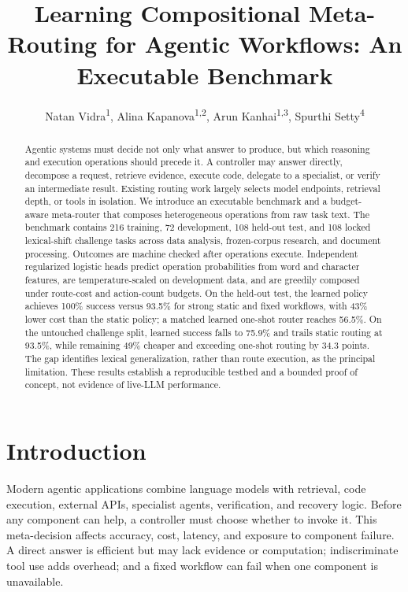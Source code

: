 \documentclass[letterpaper]{article} %
\title{Learning Compositional Meta-Routing for Agentic Workflows: An Executable Benchmark}
\author{
Natan Vidra\textsuperscript{\rm 1},
Alina Kapanova\textsuperscript{\rm 1,\rm 2},
Arun Kanhai\textsuperscript{\rm 1,\rm 3},
Spurthi Setty\textsuperscript{\rm 4}
}
\begin{document}
\maketitle

\begin{abstract}
Agentic systems must decide not only what answer to produce, but which reasoning and execution operations should precede it. A controller may answer directly, decompose a request, retrieve evidence, execute code, delegate to a specialist, or verify an intermediate result. Existing routing work largely selects model endpoints, retrieval depth, or tools in isolation. We introduce an executable benchmark and a budget-aware meta-router that composes heterogeneous operations from raw task text. The benchmark contains 216 training, 72 development, 108 held-out test, and 108 locked lexical-shift challenge tasks across data analysis, frozen-corpus research, and document processing. Outcomes are machine checked after operations execute. Independent regularized logistic heads predict operation probabilities from word and character features, are temperature-scaled on development data, and are greedily composed under route-cost and action-count budgets. On the held-out test, the learned policy achieves 100\% success versus 93.5\% for strong static and fixed workflows, with 43\% lower cost than the static policy; a matched learned one-shot router reaches 56.5\%. On the untouched challenge split, learned success falls to 75.9\% and trails static routing at 93.5\%, while remaining 49\% cheaper and exceeding one-shot routing by 34.3 points. The gap identifies lexical generalization, rather than route execution, as the principal limitation. These results establish a reproducible testbed and a bounded proof of concept, not evidence of live-LLM performance.
\end{abstract}


\section{Introduction}

Modern agentic applications combine language models with retrieval, code execution, external APIs, specialist agents, verification, and recovery logic. Before any component can help, a controller must choose whether to invoke it. This meta-decision affects accuracy, cost, latency, and exposure to component failure. A direct answer is efficient but may lack evidence or computation; indiscriminate tool use adds overhead; and a fixed workflow can fail when one component is unavailable.
\end{document}
